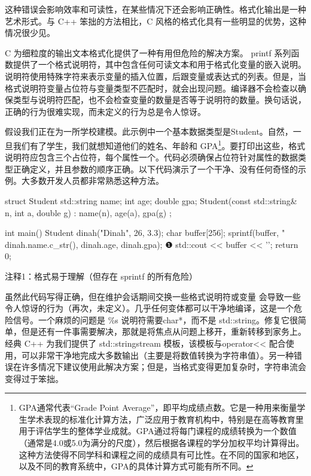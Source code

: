 这种错误会影响效率和可读性，在某些情况下还会影响正确性。格式化输出是一种艺术形式。与 C++ 笨拙的方法相比，C 风格的格式化具有一些明显的优势，这种情况很少见。


C 为细粒度的输出文本格式化提供了一种有用但危险的解决方案。
printf 系列函数提供了一个格式说明符，其中包含任何可读文本和用于格式化变量的嵌入说明。说明符使用特殊字符来表示变量的插入位置，后跟变量或表达式的列表。但是，当格式说明符变量占位符与变量类型不匹配时，就会出现问题。编译器不会检查以确保类型与说明符匹配，也不会检查变量的数量是否等于说明符的数量。换句话说，正确的行为很难实现，而未定义的行为总是令人惊讶。

假设我们正在为一所学校建模。此示例中一个基本数据类型是Student。自然，一旦我们有了学生，我们就想知道他们的姓名、年龄和 GPA\footnote{GPA通常代表“Grade Point Average”，即平均成绩点数。它是一种用来衡量学生学术表现的标准化计算方法，广泛应用于教育机构中，特别是在高等教育里用于评估学生的整体学业成就。GPA通过将每门课程的成绩转换为一个数值（通常是4.0或5.0为满分的尺度），然后根据各课程的学分加权平均计算得出。这种方法使得不同学科和课程之间的成绩具有可比性。在不同的国家和地区，以及不同的教育系统中，GPA的具体计算方式可能有所不同。}。要打印出这些，格式说明符应包含三个占位符，每个属性一个。代码必须确保占位符针对属性的数据类型正确定义，并且参数的顺序正确。以下代码演示了一个干净、没有任何奇怪的示例。大多数开发人员都非常熟悉这种方法。


\begin{cpp}
struct Student {
  std::string name;
  int age;
  double gpa;
  Student(const std::string& n, int a, double g) : name(n), age(a), gpa(g) {}
};

int main() {
  Student dinah("Dinah", 26, 3.3);
  char buffer[256];
  sprintf(buffer, "%
    dinah.name.c_str(), dinah.age, dinah.gpa); ❶
  std::cout << buffer << '\n';
  return 0;
}
\end{cpp}

{\footnotesize
注释1：格式易于理解（但存在 sprintf 的所有危险）
}


虽然此代码写得正确，但在维护会话期间交换一些格式说明符或变量 会导致一些令人惊讶的行为（再次，未定义）。几乎任何变体都可以干净地编译，这是一个危险信号。一个麻烦的问题是 \%s 说明符需要char*，而不是 std::string。修复它很简单，但是还有一件事需要解决，那就是将焦点从问题上移开，重新转移到家务上。
经典 C++ 为我们提供了 std::stringstream 模板，该模板与operator<< 配合使用，可以非常干净地完成大多数输出（主要是将数值转换为字符串值）。另一种错误在许多情况下建议使用此解决方案；但是，当格式变得更加复杂时，字符串流会变得过于笨拙。

